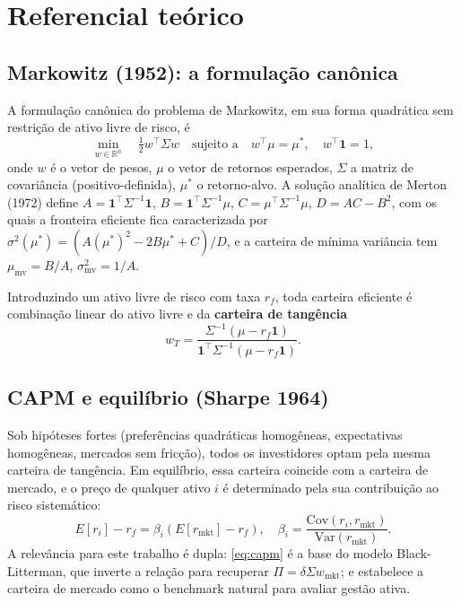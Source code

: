 \documentclass[12pt,a4paper,oneside]{article}
\begin{document}
\section{Referencial teórico}\label{sec:teoria}

\subsection{Markowitz (1952): a formulação canônica}

A formulação canônica do problema de Markowitz, em sua forma quadrática
sem restrição de ativo livre de risco, é
\begin{equation}\label{eq:markowitz-min-var}
\min_{w \in \mathbb{R}^n} \quad \tfrac{1}{2} w^\top \Sigma w
\quad \text{sujeito a} \quad w^\top \mu = \mu^*, \quad w^\top \mathbf{1} = 1,
\end{equation}
onde $w$ é o vetor de pesos, $\mu$ o vetor de retornos esperados,
$\Sigma$ a matriz de covariância (positivo-definida), $\mu^*$ o
retorno-alvo. A solução analítica de Merton (1972) define
$A = \mathbf{1}^\top \Sigma^{-1} \mathbf{1}$,
$B = \mathbf{1}^\top \Sigma^{-1} \mu$,
$C = \mu^\top \Sigma^{-1} \mu$, $D = AC - B^2$, com os quais a
fronteira eficiente fica caracterizada por
$\sigma^2(\mu^*) = (A (\mu^*)^2 - 2 B \mu^* + C)/D$, e a carteira
de mínima variância tem $\mu_{\text{mv}} = B/A$,
$\sigma^2_{\text{mv}} = 1/A$.

Introduzindo um ativo livre de risco com taxa $r_f$, toda carteira
eficiente é combinação linear do ativo livre e da \textbf{carteira
de tangência}
\begin{equation}\label{eq:tangency}
w_T = \frac{\Sigma^{-1} (\mu - r_f \mathbf{1})}{\mathbf{1}^\top \Sigma^{-1} (\mu - r_f \mathbf{1})}.
\end{equation}

\subsection{CAPM e equilíbrio (Sharpe 1964)}

Sob hipóteses fortes (preferências quadráticas homogêneas, expectativas
homogêneas, mercados sem fricção), todos os investidores optam pela
mesma carteira de tangência. Em equilíbrio, essa carteira coincide
com a carteira de mercado, e o preço de qualquer ativo $i$ é
determinado pela sua contribuição ao risco sistemático:
\begin{equation}\label{eq:capm}
E[r_i] - r_f = \beta_i (E[r_{\text{mkt}}] - r_f),
\quad \beta_i = \frac{\mathrm{Cov}(r_i, r_{\text{mkt}})}{\mathrm{Var}(r_{\text{mkt}})}.
\end{equation}
A relevância para este trabalho é dupla: \eqref{eq:capm} é a base do
modelo Black-Litterman, que inverte a relação para recuperar $\Pi =
\delta \Sigma w_{\text{mkt}}$; e estabelece a carteira de mercado
como o benchmark natural para avaliar gestão ativa.
\end{document}
